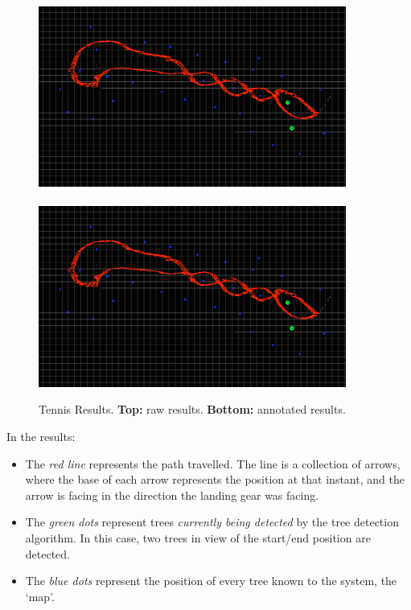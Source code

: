 \documentclass[12pt,oneside,a4paper]{book}
\begin{document}
\begin{figure}
  \centering
  \includegraphics[width=0.9\textwidth]{figs/tennis-results}\\
  ~\\
  \includegraphics[width=0.9\textwidth]{figs/tennis-results-annotated}
  \caption{Tennis Results. \textbf{Top:} raw results. \textbf{Bottom:}
  annotated results.}
  \label{fig:tennis-results}
\end{figure}

In the results:
\begin{itemize}
\item The \emph{red line} represents the path travelled. The line is a
  collection of arrows, where the base of each arrow represents the
  position at that instant, and the arrow is facing in the direction
  the landing gear was facing.
\item The \emph{green dots} represent trees \emph{currently being
    detected} by the tree detection algorithm. In this case, two trees
  in view of the start/end position are detected.
\item The \emph{blue dots} represent the position of every tree known
  to the system, the `map'.
\end{itemize}
\end{document}
